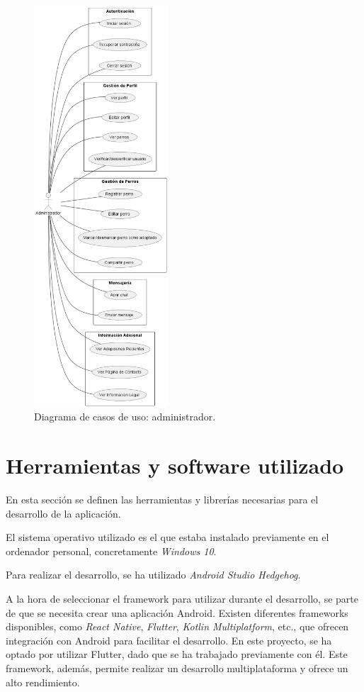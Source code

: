 \documentclass[a4paper, 12pt]{article}
\begin{document}
\begin{figure}[H]
	\begin{center}
		{\includegraphics[width=5cm]{diagram/Admin.png}\par}
		\caption{Diagrama de casos de uso: administrador.}
	\end{center}
\end{figure}





\newpage
\section{Herramientas y software utilizado}

En esta sección se definen las herramientas y librerías necesarias para el desarrollo de la aplicación.

El sistema operativo utilizado es el que estaba instalado previamente en el ordenador personal, concretamente \textit{Windows 10}.

Para realizar el desarrollo, se ha utilizado \textit{Android Studio Hedgehog}. 


A la hora de seleccionar el framework para utilizar durante el desarrollo, se parte de que se necesita crear una aplicación Android. Existen diferentes frameworks disponibles, como \textit{React Native}, \textit{Flutter}, \textit{Kotlin Multiplatform}, etc., que ofrecen integración con Android para facilitar el desarrollo. En este proyecto, se ha optado por utilizar Flutter, dado que se ha trabajado previamente con él. Este framework, además, permite realizar un desarrollo multiplataforma y ofrece un alto rendimiento.
\end{document}
